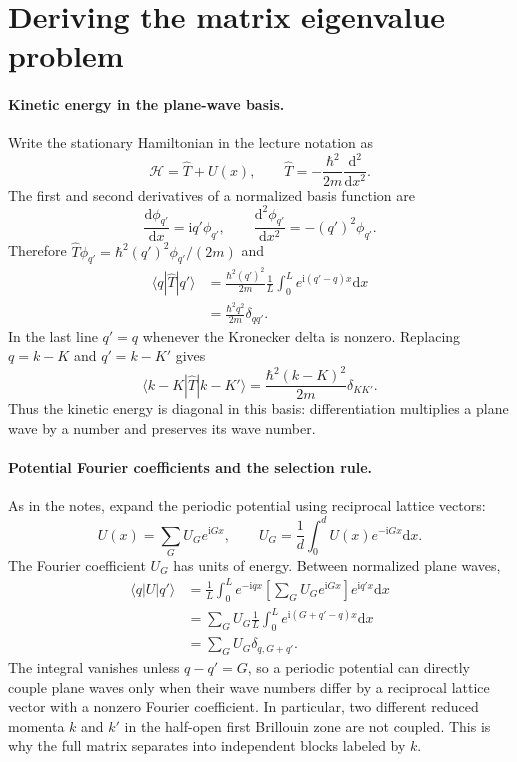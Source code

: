 \documentclass[11pt,oneside]{report}
\numberwithin{equation}{chapter}
\newcommand{\ii}{\mathrm i}
\newcommand{\dd}{\mathrm d}
\begin{document}
\section{Deriving the matrix eigenvalue problem}
\paragraph{Kinetic energy in the plane-wave basis.}
Write the stationary Hamiltonian in the lecture notation as
\begin{equation}
 \mathcal H=\hat T+U(x),\qquad \hat T=-\frac{\hbar^2}{2m}\frac{\dd^2}{\dd x^2}.
\end{equation}
The first and second derivatives of a normalized basis function are
\begin{equation}
 \frac{\dd\phi_{q'}}{\dd x}=\ii q'\phi_{q'},\qquad
 \frac{\dd^2\phi_{q'}}{\dd x^2}=-(q')^2\phi_{q'}.
\end{equation}
Therefore $\hat T\phi_{q'}=\hbar^2(q')^2\phi_{q'}/(2m)$ and
\begin{align}
 \langle q|\hat T|q'\rangle
 &=\frac{\hbar^2(q')^2}{2m}\frac1L\int_0^L e^{\ii(q'-q)x}\dd x\nonumber\\
 &=\frac{\hbar^2q^2}{2m}\delta_{qq'}.
\end{align}
In the last line $q'=q$ whenever the Kronecker delta is nonzero. Replacing $q=k-K$ and $q'=k-K'$ gives
\begin{equation}\label{eq:noteskinetic}
 \boxed{\langle k-K|\hat T|k-K'\rangle=
 \frac{\hbar^2(k-K)^2}{2m}\delta_{KK'}.}
\end{equation}
Thus the kinetic energy is diagonal in this basis: differentiation multiplies a plane wave by a number and preserves its wave number.

\paragraph{Potential Fourier coefficients and the selection rule.}
As in the notes, expand the periodic potential using reciprocal lattice vectors:
\begin{equation}\label{eq:notespotential}
 U(x)=\sum_G U_G e^{\ii Gx},\qquad
 U_G=\frac1d\int_0^d U(x)e^{-\ii Gx}\dd x.
\end{equation}
The Fourier coefficient $U_G$ has units of energy. Between normalized plane waves,
\begin{align}
 \langle q|U|q'\rangle
 &=\frac1L\int_0^L e^{-\ii qx}\left[\sum_GU_Ge^{\ii Gx}\right]e^{\ii q'x}\dd x\nonumber\\
 &=\sum_GU_G\frac1L\int_0^L e^{\ii(G+q'-q)x}\dd x\nonumber\\
 &=\sum_GU_G\delta_{q,G+q'}.
\end{align}
The integral vanishes unless $q-q'=G$, so a periodic potential can directly couple plane waves only when their wave numbers differ by a reciprocal lattice vector with a nonzero Fourier coefficient. In particular, two different reduced momenta $k$ and $k'$ in the half-open first Brillouin zone are not coupled. This is why the full matrix separates into independent blocks labeled by $k$.
\end{document}
